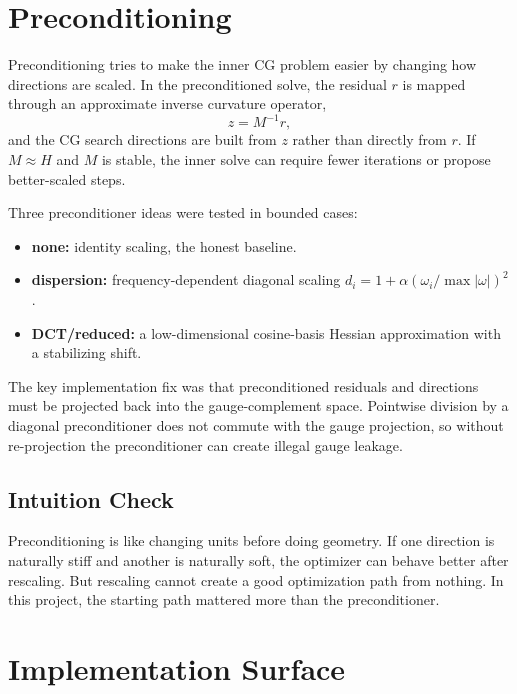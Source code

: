 \documentclass[11pt]{article}
\begin{document}
\section{Preconditioning}

Preconditioning tries to make the inner CG problem easier by changing how
directions are scaled. In the preconditioned solve, the residual \(r\) is
mapped through an approximate inverse curvature operator,
\[
    z=M^{-1}r,
\]
and the CG search directions are built from \(z\) rather than directly from
\(r\). If \(M\approx H\) and \(M\) is stable, the inner solve can require fewer
iterations or propose better-scaled steps.

Three preconditioner ideas were tested in bounded cases:
\begin{itemize}
    \item \textbf{none:} identity scaling, the honest baseline.
    \item \textbf{dispersion:} frequency-dependent diagonal scaling
    \(d_i=1+\alpha(\omega_i/\max|\omega|)^2\).
    \item \textbf{DCT/reduced:} a low-dimensional cosine-basis Hessian
    approximation with a stabilizing shift.
\end{itemize}

The key implementation fix was that preconditioned residuals and directions
must be projected back into the gauge-complement space. Pointwise division by
a diagonal preconditioner does not commute with the gauge projection, so
without re-projection the preconditioner can create illegal gauge leakage.

\subsection*{Intuition Check}

Preconditioning is like changing units before doing geometry. If one direction
is naturally stiff and another is naturally soft, the optimizer can behave
better after rescaling. But rescaling cannot create a good optimization path
from nothing. In this project, the starting path mattered more than the
preconditioner.

\section{Implementation Surface}
\end{document}
